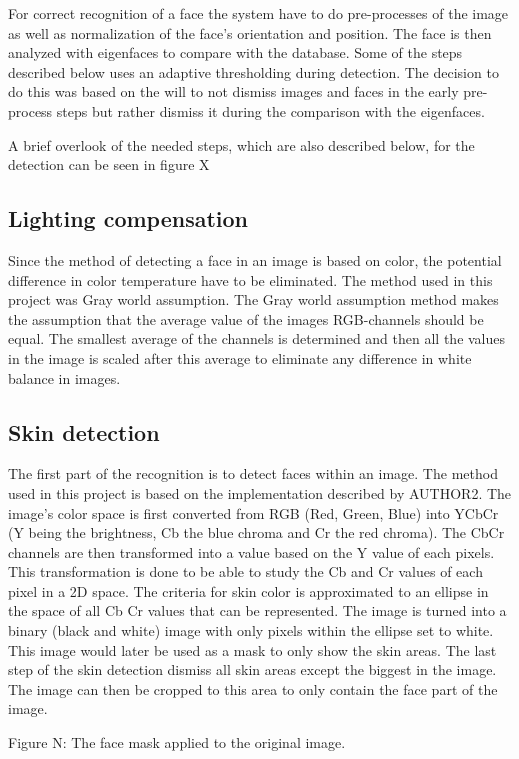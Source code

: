 For correct recognition of a face the system have to do pre-processes of the image as well as normalization of the face’s orientation and position. The face is then analyzed with eigenfaces to compare with the database. Some of the steps described below uses an adaptive thresholding during detection. The decision to do this was based on the will to not dismiss images and faces in the early pre-process steps but rather dismiss it during the comparison with the eigenfaces.

A brief overlook of the needed steps, which are also described below, for the detection can be seen in figure X

\subsection{Lighting compensation}
Since the method of detecting a face in an image is based on color, the potential difference in color temperature have to be eliminated. The method used in this project was Gray world assumption. The Gray world assumption method makes the assumption that the average value of the images RGB-channels should be equal. The smallest average of the channels is determined and then all the values in the image is scaled after this average to eliminate any difference in white balance in images.

\subsection{Skin detection}
The first part of the recognition is to detect faces within an image. The method used in this project is based on the implementation described by AUTHOR2. The image’s color space is first converted from RGB (Red, Green, Blue) into YCbCr (Y being the brightness, Cb the blue chroma and Cr the red chroma). The CbCr channels are then transformed into a value based on the Y value of each pixels. This transformation is done to be able to study the Cb and Cr values of each pixel in a 2D space. The criteria for skin color is approximated to an ellipse in the space of all Cb Cr values that can be represented. The image is turned into a binary (black and white) image with only pixels within the ellipse set to white. This image would later be used as a mask to only show the skin areas. The last step of the skin detection dismiss all skin areas except the biggest in the image. The image can then be cropped to this area to only contain the face part of the image.

Figure N: The face mask applied to the original image.


